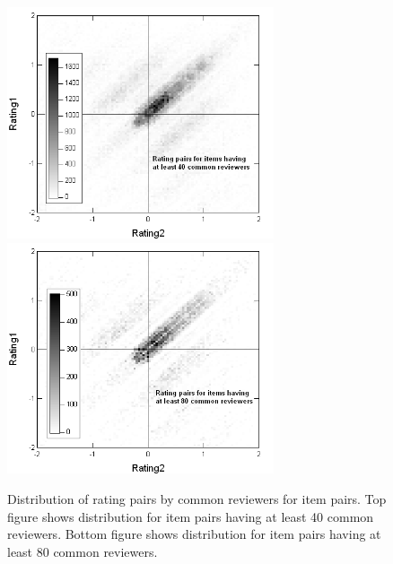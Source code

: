 \documentclass[11pt]{article}
\begin{document}
\begin{figure}[!htbp]
    \centering
    \includegraphics[width=0.7\textwidth]{RatingDist_40.png}
    \includegraphics[width=0.7\textwidth]{RatingDist_80.png}
	\caption{Distribution of rating pairs by common reviewers for item pairs.
Top figure shows distribution for item pairs having at least 40 common
reviewers. Bottom figure shows distribution for item pairs having at least 80
common reviewers.}
    \label{fig:RatingDist}
\end{figure}
\end{document}
